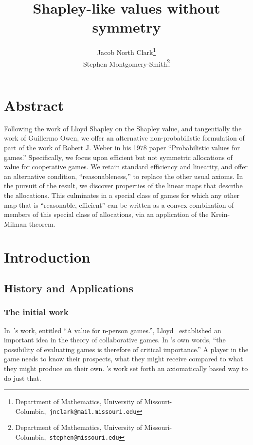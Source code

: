 \documentclass[12pt,letterpaper,final]{article}
\theoremstyle{plain}
\theoremstyle{plain}
\theoremstyle{plain}
\theoremstyle{plain}
\theoremstyle{plain}
\theoremstyle{plain}
\theoremstyle{plain}
\theoremstyle{definition}
\theoremstyle{definition}
\theoremstyle{definition}
\theoremstyle{definition}
\theoremstyle{definition}
\theoremstyle{remark}
\theoremstyle{remark}
\theoremstyle{remark}
\theoremstyle{remark}
\begin{document}
\newcommand{\dissertationtitle}{Shapley-like values without symmetry}
\title{\dissertationtitle}

\author{Jacob North Clark\thanks{Department of Mathematics, University
    of Missouri-Columbia,~\texttt{jnclark@mail.missouri.edu}}\\Stephen
  Montgomery-Smith\thanks{Department of Mathematics, University of
    Missouri-Columbia,~\texttt{stephen@missouri.edu}}}
\date{}
\maketitle

\section*{\centering Abstract}

Following the work of Lloyd Shapley on the Shapley value, and
tangentially the work of Guillermo Owen, we offer an alternative
non-probabilistic formulation of part of the work of Robert J. Weber
in his 1978 paper ``Probabilistic values for games.''  Specifically,
we focus upon efficient but not symmetric allocations of value for
cooperative games. We retain standard efficiency and linearity, and offer an alternative condition,
``reasonableness,''  to
replace the other usual axioms. In the pursuit of the result, we discover
properties of the linear maps that describe the allocations. This
culminates in a special class of games for which any other map that is
``reasonable, efficient'' can be written as a convex combination of
members of this special class of allocations, via an application of
the Krein-Milman theorem.



\section{Introduction}\label{cha:introduction}

\subsection{History and Applications}

\subsubsection{The initial work}
In~\citeauthor{Shapley53}'s \citeyear{Shapley53} work, entitled
``A value for n-person games.'', Lloyd~\citeauthor{Shapley53} established an important idea in the theory of
collaborative games. In \citeauthor{Shapley53}'s own words,
``the possibility of evaluating games is therefore of critical
importance.'' A player in the game needs to know their
prospects, what they might receive compared to what they might
produce on their own. \citeauthor{Shapley53}'s work set forth an axiomatically
based way to do just that.
\end{document}
